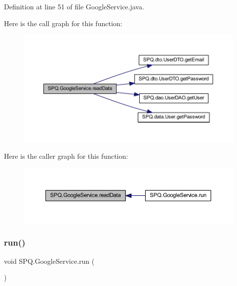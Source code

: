 Definition at line 51 of file Google\+Service.\+java.

Here is the call graph for this function\+:
\nopagebreak
\begin{figure}[H]
\begin{center}
\leavevmode
\includegraphics[width=350pt]{class_s_p_q_1_1_google_service_a94e224618cc0433776bcb49bff80067f_cgraph}
\end{center}
\end{figure}
Here is the caller graph for this function\+:
\nopagebreak
\begin{figure}[H]
\begin{center}
\leavevmode
\includegraphics[width=350pt]{class_s_p_q_1_1_google_service_a94e224618cc0433776bcb49bff80067f_icgraph}
\end{center}
\end{figure}
\mbox{\label{class_s_p_q_1_1_google_service_aecd41a7e761dc392fc96e096547dc504}} 
\subsubsection{\texorpdfstring{run()}{run()}}
{\footnotesize\ttfamily void S\+P\+Q.\+Google\+Service.\+run (\begin{DoxyParamCaption}{ }\end{DoxyParamCaption})}



